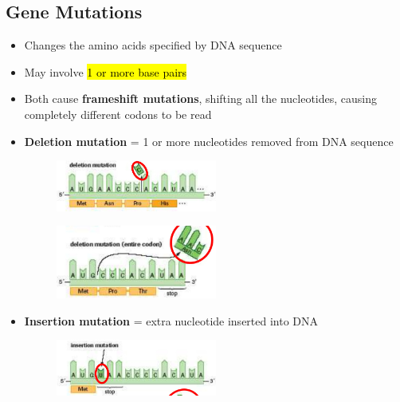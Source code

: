 \documentclass[a4paper,12pt]{article}
\begin{document}
\subsection{Gene Mutations}
\begin{itemize}
    \item{Changes the amino acids specified by DNA sequence}
    \item{May involve \hl{1 or more base pairs}}
    \item{Both cause \textbf{frameshift mutations}, shifting all the nucleotides, causing completely different codons to be read}
\end{itemize}

\begin{itemize}
    \item{
            \textbf{Deletion mutation} = 1 or more nucleotides removed from DNA sequence
            \begin{figure}[H]
                \centering
                \includegraphics[width=0.50\textwidth]{deletion}
            \end{figure}

            \begin{figure}[H]
                \centering
                \includegraphics[width=0.50\textwidth]{deletion2}
            \end{figure}
        }
    \item{
            \textbf{Insertion mutation} = extra nucleotide inserted into DNA
            \begin{figure}[H]
                \centering
                \includegraphics[width=0.50\textwidth]{insertion}
            \end{figure}
        }
\end{itemize}
\end{document}

